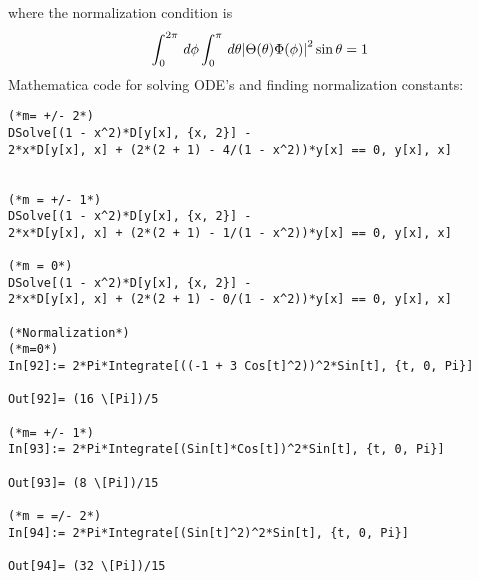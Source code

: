 \documentclass{article}
\theoremstyle{definition}
\begin{document}
where the normalization condition is 
\begin{align*}
\int^{2\pi}_0 \,d\phi \int^\pi_0 \,d\theta \abs{\Theta(\theta)\Phi(\phi)}^2\sin\theta = 1
\end{align*}
Mathematica code for solving ODE's and finding normalization constants:
\begin{lstlisting}
(*m= +/- 2*)
DSolve[(1 - x^2)*D[y[x], {x, 2}] - 
2*x*D[y[x], x] + (2*(2 + 1) - 4/(1 - x^2))*y[x] == 0, y[x], x]


(*m = +/- 1*)
DSolve[(1 - x^2)*D[y[x], {x, 2}] - 
2*x*D[y[x], x] + (2*(2 + 1) - 1/(1 - x^2))*y[x] == 0, y[x], x]

(*m = 0*)
DSolve[(1 - x^2)*D[y[x], {x, 2}] - 
2*x*D[y[x], x] + (2*(2 + 1) - 0/(1 - x^2))*y[x] == 0, y[x], x]

(*Normalization*)
(*m=0*)
In[92]:= 2*Pi*Integrate[((-1 + 3 Cos[t]^2))^2*Sin[t], {t, 0, Pi}]

Out[92]= (16 \[Pi])/5

(*m= +/- 1*)
In[93]:= 2*Pi*Integrate[(Sin[t]*Cos[t])^2*Sin[t], {t, 0, Pi}]

Out[93]= (8 \[Pi])/15

(*m = =/- 2*)
In[94]:= 2*Pi*Integrate[(Sin[t]^2)^2*Sin[t], {t, 0, Pi}]

Out[94]= (32 \[Pi])/15
\end{lstlisting}
\end{document}
